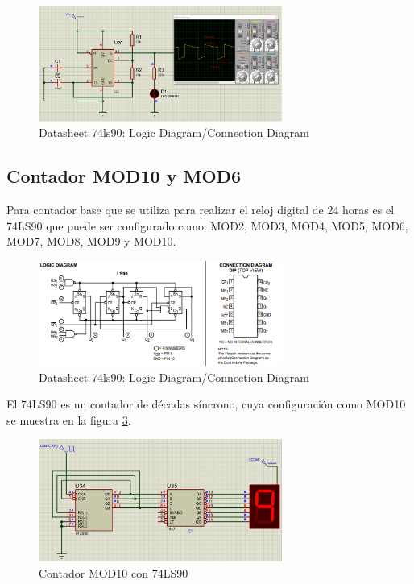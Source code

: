 \begin{figure}[h]
    \begin{center}
    \includegraphics[width=8cm]{images/image3.png}
    \newline
    \caption{Datasheet 74ls90: Logic Diagram/Connection Diagram}\label{osiloscop_sim}
    \end{center}
\end{figure}

\subsection{Contador MOD10 y MOD6}
Para contador base que se utiliza para realizar el reloj digital de 24 horas es el 74LS90 que puede ser configurado como: MOD2, MOD3, MOD4, MOD5, MOD6, MOD7, MOD8, MOD9 y MOD10.
\begin{figure}[h]
    \begin{center}
    \includegraphics[width=8cm]{images/image2.png}
    \newline
    \caption{Datasheet 74ls90: Logic Diagram/Connection Diagram}\label{datasheet_diagram}
    \end{center}
\end{figure}
El 74LS90 es un contador de décadas síncrono, cuya configuración como MOD10 se muestra en la figura \ref{cont_MOD10}.
\begin{figure}[h]
    \begin{center}
    \includegraphics[width=8cm]{images/image4.png}
    \newline
    \caption{Contador MOD10 con 74LS90}\label{cont_MOD10}
    \end{center}
\end{figure}
